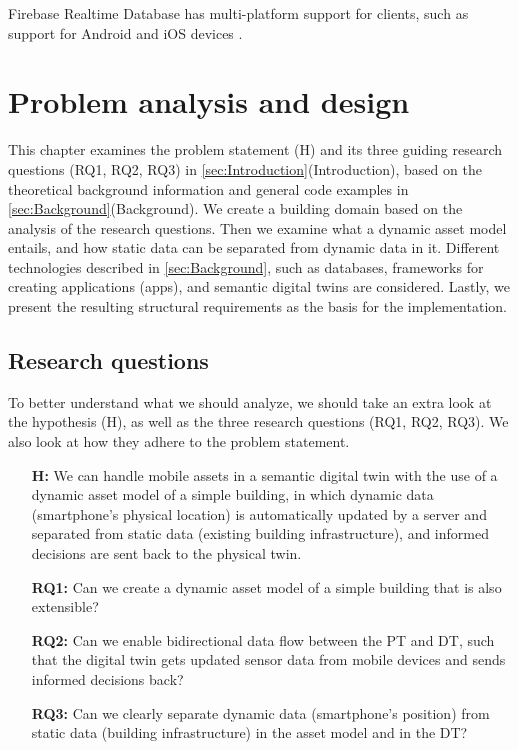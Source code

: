 \documentclass{article}
\begin{document}
Firebase Realtime Database has multi-platform support for clients, such as support for Android and iOS devices \cite{noauthor_firebase_nodate}.



\newpage
\section{Problem analysis and design}\label{sec:Analysis}
This chapter examines the problem statement (H) and its three guiding research questions (RQ1, RQ2, RQ3) in \ref{sec:Introduction}(Introduction), based on the theoretical background information and general code examples in \ref{sec:Background}(Background). We create a building domain based on the analysis of the research questions. Then we examine what a dynamic asset model entails, and how static data can be separated from dynamic data in it. Different technologies described in \ref{sec:Background}, such as databases, frameworks for creating applications (apps), and semantic digital twins are considered. Lastly, we present the resulting structural requirements as the basis for the implementation.

\subsection{Research questions}
To better understand what we should analyze, we should take an extra look at the hypothesis (H), as well as the three research questions (RQ1, RQ2, RQ3). We also look at how they adhere to the problem statement.

\begin{itemize}
    \item[\textbf{H:}] We can handle mobile assets in a semantic digital twin with the use of a dynamic asset model of a simple building, in which dynamic data (smartphone's physical location) is automatically updated by a server and separated from static data (existing building infrastructure), and informed decisions are sent back to the physical twin.
    \item[\textbf{RQ1:}]
    Can we create a dynamic asset model of a simple building that is also extensible?
    \item [\textbf{RQ2:}] 
    Can we enable bidirectional data flow between the PT and DT, such that the digital twin gets updated sensor data from mobile devices and sends informed decisions back?
    \item [\textbf{RQ3:}]
    Can we clearly separate dynamic data (smartphone's position) from static data (building infrastructure) in the asset model and in the DT?
\end{itemize} 
\end{document}

